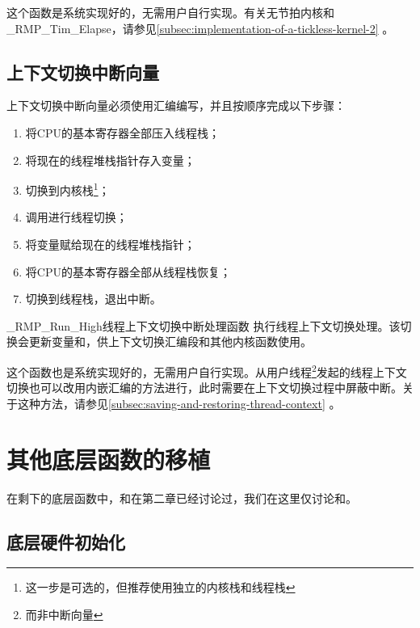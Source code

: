 这个函数是系统实现好的，无需用户自行实现。有关无节拍内核和\_RMP\_Tim\_Elapse，请参见\ref{subsec:implementation-of-a-tickless-kernel-2}
。

\subsection{上下文切换中断向量}\label{subsec:context-switch-vector}

上下文切换中断向量必须使用汇编编写，并且按顺序完成以下步骤：

\begin{enumerate}
\def\labelenumi{\arabic{enumi}.}
\item
  将CPU的基本寄存器全部压入线程栈；
\item
  将现在的线程堆栈指针存入变量；
\item
  切换到内核栈\footnote{这一步是可选的，但推荐使用独立的内核栈和线程栈}；
\item
  调用进行线程切换；
\item
  将变量赋给现在的线程堆栈指针；
\item
  将CPU的基本寄存器全部从线程栈恢复；
\item
  切换到线程栈，退出中断。
\end{enumerate}

\begin{apidesc}{\_RMP\_Run\_High}{线程上下文切换中断处理函数}
    执行线程上下文切换处理。该切换会更新变量和，供上下文切换汇编段和其他内核函数使用。
    \begin{apiparams}
    \end{apiparams}
    \begin{apiret}
    \end{apiret}
\end{apidesc}

这个函数也是系统实现好的，无需用户自行实现。从用户线程\footnote{而非中断向量}发起的线程上下文切换也可以改用内嵌汇编的方法进行，此时需要在上下文切换过程中屏蔽中断。关于这种方法，请参见\ref{subsec:saving-and-restoring-thread-context}
。

\section{其他底层函数的移植}\label{sec:porting-the-other-low-level-functions}

在剩下的底层函数中，和在第二章已经讨论过，我们在这里仅讨论和。

\subsection{底层硬件初始化}\label{subsec:low-level-hardware-initialisation}

